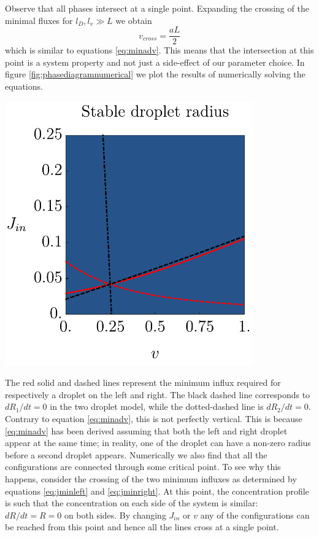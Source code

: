 \documentclass{Dissertate}
\let\origfigure\figure
\let\endorigfigure\endfigure
\renewenvironment{figure}[1][2] {
    \expandafter\origfigure\expandafter[H]
} {
    \endorigfigure
}
\begin{document}
Observe that all phases intersect at a single point. Expanding the crossing
of the minimal fluxes for \(l_D,l_v\gg L\) we obtain \[
v_{cross}=\frac{aL}{2}
\] which is similar to equations \ref{eq:minadv}. This means that the
intersection at this point is a system property and not just a
side-effect of our parameter choice. In figure
\ref{fig:phasediagramnumerical} we plot the results of numerically
solving the equations.

\begin{figure}
\hypertarget{fig:phasediagramnumerical}{%
\centering
\includegraphics[width=0.8\textwidth]{source/figures/pdf/Numericalphase.pdf}
\caption{Phase diagram }
\label{fig:phasediagramnumerical}
}
\end{figure}

The red solid and dashed lines represent the minimum influx required for
respectively a droplet on the left and right. The black dashed line
corresponds to \(dR_1/dt=0\) in the two droplet model, while the
dotted-dashed line is \(dR_2/dt=0\). Contrary to equation \ref{eq:minadv}, this is not perfectly vertical. This is because \ref{eq:minadv} has been derived assuming that both the left and
right droplet appear at the same time; in reality, one of the droplet
can have a non-zero radius before a second droplet appears. Numerically
we also find that all the configurations are connected through some critical
point. To see why this happens, consider the crossing of the two minimum influxes as determined by equations \ref{eq:jminleft} and \ref{eq:jminright}. At this point, the concentration profile is such that the concentration on each side of the system is similar: \(dR/dt=R=0\) on
both sides. By changing \(J_{in}\) or \(v\) any of the configurations can be
reached from this point and hence all the lines cross at a single point.
\end{document}
